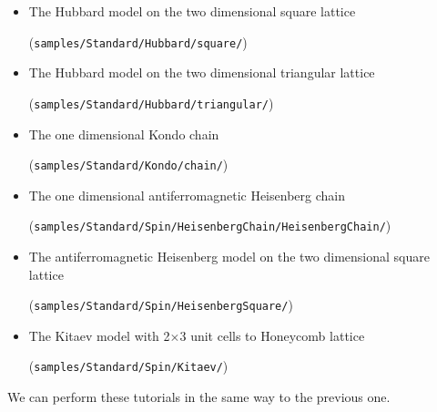 \begin{itemize}
\item The Hubbard model on the two dimensional square lattice

  (\verb|samples/Standard/Hubbard/square/|)
\item The Hubbard model on the two dimensional triangular lattice
  
  (\verb|samples/Standard/Hubbard/triangular/|)
\item The one dimensional Kondo chain

  (\verb|samples/Standard/Kondo/chain/|)
\item The one dimensional antiferromagnetic Heisenberg chain
  
  (\verb|samples/Standard/Spin/HeisenbergChain/HeisenbergChain/|)
\item The antiferromagnetic Heisenberg model on the two dimensional square lattice
  
  (\verb|samples/Standard/Spin/HeisenbergSquare/|)
\item The Kitaev model with 2$\times$3 unit cells to Honeycomb lattice
  
  (\verb|samples/Standard/Spin/Kitaev/|)
\end{itemize}

We can perform these tutorials in the same way to the previous one.
